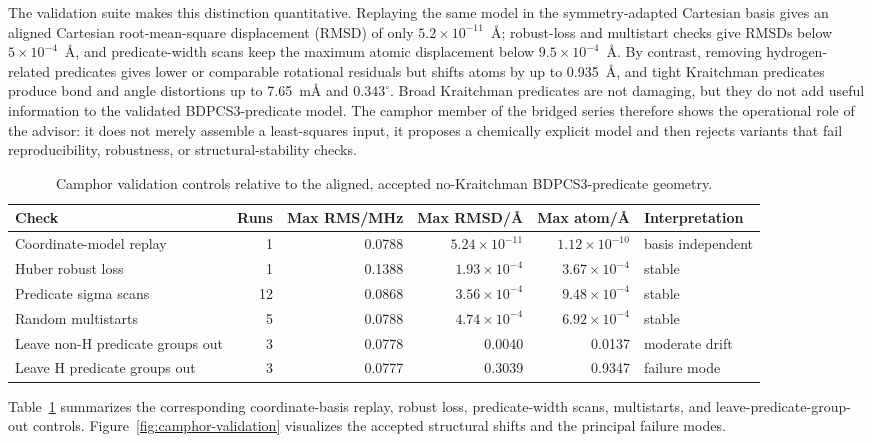 \documentclass[aip,jcp,reprint,longbibliography,floatfix]{revtex4-2}
\begin{document}
The validation suite makes this distinction quantitative. Replaying the same
model in the symmetry-adapted Cartesian basis gives an aligned Cartesian
root-mean-square displacement (RMSD) of only
$5.2\times 10^{-11}$~\AA{}; robust-loss and multistart checks give RMSDs below
$5\times10^{-4}$~\AA{}, and predicate-width
scans keep the maximum atomic displacement below $9.5\times10^{-4}$~\AA{}.
By contrast, removing hydrogen-related predicates gives lower or comparable
rotational residuals but shifts atoms by up to 0.935~\AA{}, and tight
Kraitchman predicates produce bond and angle distortions up to 7.65~m\AA{}
and $0.343^\circ$. Broad Kraitchman predicates are not damaging, but they do
not add useful information to the validated BDPCS3-predicate model. The
camphor member of the bridged series therefore shows the operational role of
the advisor: it does not merely assemble a least-squares input, it proposes a
chemically explicit model and then rejects variants that fail reproducibility,
robustness, or structural-stability checks.

\begin{table}[t]
\caption{Camphor validation controls relative to the aligned, accepted
no-Kraitchman BDPCS3-predicate geometry.}
\label{tab:camphor-final-validation}
\centering
\footnotesize
\setlength{\tabcolsep}{4pt}
\begin{tabular}{lrrrrl}
\toprule
Check & Runs & Max RMS/MHz & Max RMSD/\AA{} & Max atom/\AA{} & Interpretation \\
\midrule
Coordinate-model replay & 1 & 0.0788 & $5.24\times10^{-11}$ & $1.12\times10^{-10}$ & basis independent \\
Huber robust loss & 1 & 0.1388 & $1.93\times10^{-4}$ & $3.67\times10^{-4}$ & stable \\
Predicate sigma scans & 12 & 0.0868 & $3.56\times10^{-4}$ & $9.48\times10^{-4}$ & stable \\
Random multistarts & 5 & 0.0788 & $4.74\times10^{-4}$ & $6.92\times10^{-4}$ & stable \\
Leave non-H predicate groups out & 3 & 0.0778 & 0.0040 & 0.0137 & moderate drift \\
Leave H predicate groups out & 3 & 0.0777 & 0.3039 & 0.9347 & failure mode \\
\bottomrule
\end{tabular}
\end{table}

Table~\ref{tab:camphor-final-validation} summarizes the corresponding
coordinate-basis replay, robust loss, predicate-width scans, multistarts, and
leave-predicate-group-out controls.
Figure~\ref{fig:camphor-validation} visualizes the accepted structural shifts
and the principal failure modes.
\end{document}
